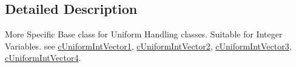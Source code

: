 \subsection{Detailed Description}
More Specific Base class for Uniform Handling classes. Suitable for Integer Variables. see \hyperlink{classc_uniform_int_vector1}{cUniformIntVector1}, \hyperlink{classc_uniform_int_vector2}{cUniformIntVector2}, \hyperlink{classc_uniform_int_vector3}{cUniformIntVector3}, \hyperlink{classc_uniform_int_vector4}{cUniformIntVector4}. 